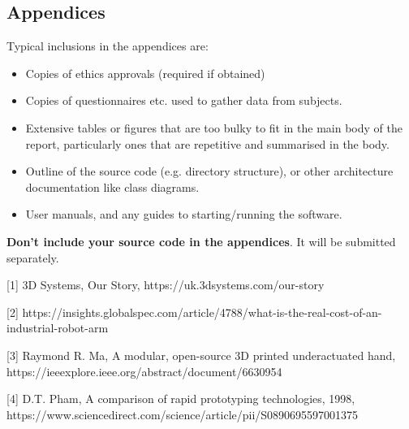\documentclass{l4proj}
\begin{document}
\begin{appendices}

\chapter{Appendices}

Typical inclusions in the appendices are:

\begin{itemize}
\item
  Copies of ethics approvals (required if obtained)
\item
  Copies of questionnaires etc. used to gather data from subjects.
\item
  Extensive tables or figures that are too bulky to fit in the main body of
  the report, particularly ones that are repetitive and summarised in the body.

\item Outline of the source code (e.g. directory structure), or other architecture documentation like class diagrams.

\item User manuals, and any guides to starting/running the software.

\end{itemize}

\textbf{Don't include your source code in the appendices}. It will be
submitted separately.

\end{appendices}







[1] 3D Systems, Our Story, https://uk.3dsystems.com/our-story

[2] https://insights.globalspec.com/article/4788/what-is-the-real-cost-of-an-industrial-robot-arm

[3] Raymond R. Ma, A modular, open-source 3D printed underactuated hand, https://ieeexplore.ieee.org/abstract/document/6630954

[4] D.T. Pham, A comparison of rapid prototyping technologies, 1998, https://www.sciencedirect.com/science/article/pii/S0890695597001375
\end{document}

